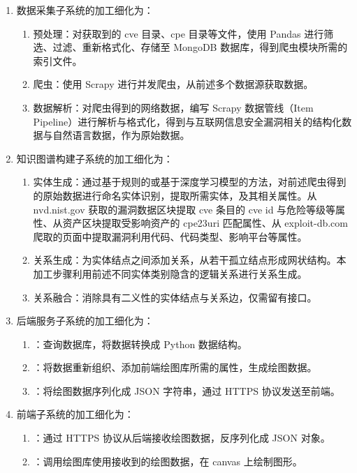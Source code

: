 \documentclass[a4paper,AutoFakeBold,oneside,12pt]{book}
\begin{document}
\begin{enumerate}
	\item 数据采集子系统的加工细化为：
	      \begin{enumerate}
		      \item 预处理：对获取到的 cve 目录、cpe 目录等文件，使用 Pandas 进行筛选、过滤、重新格式化、存储至 MongoDB 数据库，得到爬虫模块所需的索引文件。
		      \item 爬虫：使用 Scrapy 进行并发爬虫，从前述多个数据源获取数据。
		      \item 数据解析：对爬虫得到的网络数据，编写 Scrapy 数据管线（Item Pipeline）进行解析与格式化，得到与互联网信息安全漏洞相关的结构化数据与自然语言数据，作为原始数据。
	      \end{enumerate}
	\item 知识图谱构建子系统的加工细化为：
	      \begin{enumerate}
		      \item 实体生成：通过基于规则的或基于深度学习模型的方法，对前述爬虫得到的原始数据进行命名实体识别，提取所需实体，及其相关属性。从 nvd.nist.gov 获取的漏洞数据区块提取 cve 条目的 cve id 与危险等级等属性、从资产区块提取受影响资产的 cpe23uri 匹配属性、从 exploit-db.com 爬取的页面中提取漏洞利用代码、代码类型、影响平台等属性。
		      \item 关系生成：为实体结点之间添加关系，从若干孤立结点形成网状结构。本加工步骤利用前述不同实体类别隐含的逻辑关系进行关系生成。
		      \item 关系融合：消除具有二义性的实体结点与关系边，仅需留有接口。
	      \end{enumerate}
	\item 后端服务子系统的加工细化为：
	      \begin{enumerate}
		      \item ：查询数据库，将数据转换成 Python 数据结构。
		      \item ：将数据重新组织、添加前端绘图库所需的属性，生成绘图数据。
		      \item ：将绘图数据序列化成 JSON 字符串，通过 HTTPS 协议发送至前端。
	      \end{enumerate}
	\item 前端子系统的加工细化为：
	      \begin{enumerate}
		      \item ：通过 HTTPS 协议从后端接收绘图数据，反序列化成 JSON 对象。
		      \item ：调用绘图库使用接收到的绘图数据，在 canvas 上绘制图形。
	      \end{enumerate}
\end{enumerate}
\end{document}
